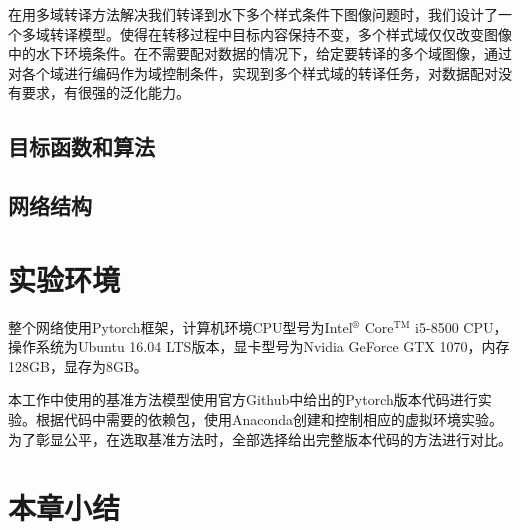 在用多域转译方法解决我们转译到水下多个样式条件下图像问题时，我们设计了一个多域转译模型。使得在转移过程中目标内容保持不变，多个样式域仅仅改变图像中的水下环境条件。在不需要配对数据的情况下，给定要转译的多个域图像，通过对各个域进行编码作为域控制条件，实现到多个样式域的转译任务，对数据配对没有要求，有很强的泛化能力。

\subsection{目标函数和算法}


\subsection{网络结构}



\section{实验环境}
整个网络使用Pytorch框架，计算机环境CPU型号为Intel$^\circledR$ Core$^{\text{TM}}$ i5-8500 CPU，操作系统为Ubuntu 16.04 LTS版本，显卡型号为Nvidia GeForce GTX 1070，内存128GB，显存为8GB。

本工作中使用的基准方法模型使用官方Github中给出的Pytorch版本代码进行实验。根据代码中需要的依赖包，使用Anaconda创建和控制相应的虚拟环境实验。为了彰显公平，在选取基准方法时，全部选择给出完整版本代码的方法进行对比。

\section{本章小结}
